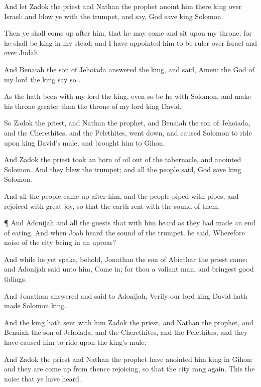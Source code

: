 {And let
Zadok the
priest and
Nathan the
prophet
anoint him there
king over
Israel: and
blow ye with the
trumpet, and
say, God
save
king
Solomon.

Then ye shall come
up
after him, that he may
come and
sit upon my
throne; for he shall be
king in my stead: and I have
appointed him to be
ruler over
Israel and over
Judah.

And
Benaiah the
son of
Jehoiada
answered the
king, and
said,
Amen: the
{}
God of my
lord the
king
say so
{}.

As the
{} hath been with my
lord the
king, even so be he with
Solomon, and
make his
throne
greater than the
throne of my
lord
king
David.

So
Zadok the
priest, and
Nathan the
prophet, and
Benaiah the
son of
Jehoiada, and the
Cherethites, and the
Pelethites, went
down, and caused
Solomon to
ride upon
king
David’s
mule, and
brought him to
Gihon.

And
Zadok the
priest
took an
horn of
oil out of the
tabernacle, and
anointed
Solomon. And they
blew the
trumpet; and all the
people
said, God
save
king
Solomon.

And all the
people came
up
after him, and the
people
piped with
pipes, and
rejoiced with
great
joy, so that the
earth
rent with the
sound of them.


\par }{\PP {}¶ And
Adonijah and all the
guests that
{} with him
heard
{} as they had made an
end of
eating. And when
Joab
heard the
sound of the
trumpet, he
said, Wherefore
{}
noise of the
city being in an
uproar?

And while he yet
spake, behold,
Jonathan the
son of
Abiathar the
priest
came: and
Adonijah
said unto him, Come
in; for thou
{} a
valiant
man, and
bringest
good
tidings.

And
Jonathan
answered and
said to
Adonijah,
Verily our
lord
king
David hath made
Solomon
king.

And the
king hath
sent with him
Zadok the
priest, and
Nathan the
prophet, and
Benaiah the
son of
Jehoiada, and the
Cherethites, and the
Pelethites, and they have caused him to
ride upon the
king’s
mule:

And
Zadok the
priest and
Nathan the
prophet have
anointed him
king in
Gihon: and they are come
up from thence
rejoicing, so that the
city rang
again. This
{} the
noise that ye have
heard.

}
